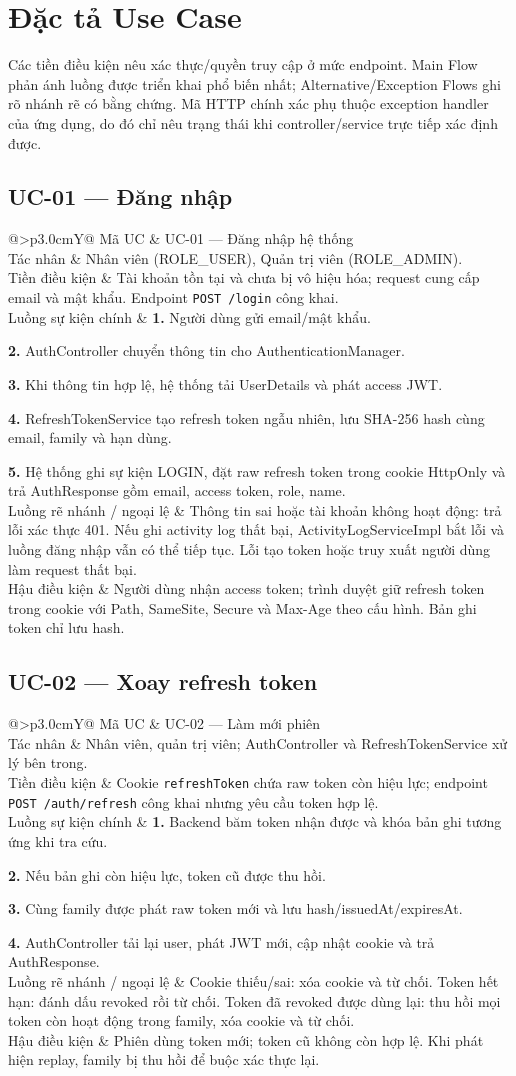 \documentclass[12pt,a4paper,oneside]{report}
\makeatletter
\newcommand{\UC}[6]{%
\par\medskip\noindent\begin{tabularx}{\textwidth}{@{}>{\bfseries\color{navy}}p{3.0cm}Y@{}}\toprule
Mã UC & #1\\
Tác nhân & #2\\
Tiền điều kiện & #3\\
Luồng sự kiện chính & #4\\
Luồng rẽ nhánh / ngoại lệ & #5\\
Hậu điều kiện & #6\\
\bottomrule\end{tabularx}\par\smallskip
}
\makeatother
\begin{document}
\section{Đặc tả Use Case}
Các tiền điều kiện nêu xác thực/quyền truy cập ở mức endpoint. Main Flow phản ánh luồng được triển khai phổ biến nhất; Alternative/Exception Flows ghi rõ nhánh rẽ có bằng chứng. Mã HTTP chính xác phụ thuộc exception handler của ứng dụng, do đó chỉ nêu trạng thái khi controller/service trực tiếp xác định được.

\subsection{UC-01 — Đăng nhập}
\UC{UC-01 — Đăng nhập hệ thống}{Nhân viên (ROLE\_USER), Quản trị viên (ROLE\_ADMIN).}{Tài khoản tồn tại và chưa bị vô hiệu hóa; request cung cấp email và mật khẩu. Endpoint \texttt{POST /login} công khai.}{\textbf{1.} Người dùng gửi email/mật khẩu.\par\textbf{2.} AuthController chuyển thông tin cho AuthenticationManager.\par\textbf{3.} Khi thông tin hợp lệ, hệ thống tải UserDetails và phát access JWT.\par\textbf{4.} RefreshTokenService tạo refresh token ngẫu nhiên, lưu SHA-256 hash cùng email, family và hạn dùng.\par\textbf{5.} Hệ thống ghi sự kiện LOGIN, đặt raw refresh token trong cookie HttpOnly và trả AuthResponse gồm email, access token, role, name.}{Thông tin sai hoặc tài khoản không hoạt động: trả lỗi xác thực 401. Nếu ghi activity log thất bại, ActivityLogServiceImpl bắt lỗi và luồng đăng nhập vẫn có thể tiếp tục. Lỗi tạo token hoặc truy xuất người dùng làm request thất bại.}{Người dùng nhận access token; trình duyệt giữ refresh token trong cookie với Path, SameSite, Secure và Max-Age theo cấu hình. Bản ghi token chỉ lưu hash.}

\subsection{UC-02 — Xoay refresh token}
\UC{UC-02 — Làm mới phiên}{Nhân viên, quản trị viên; AuthController và RefreshTokenService xử lý bên trong.}{Cookie \texttt{refreshToken} chứa raw token còn hiệu lực; endpoint \texttt{POST /auth/refresh} công khai nhưng yêu cầu token hợp lệ.}{\textbf{1.} Backend băm token nhận được và khóa bản ghi tương ứng khi tra cứu.\par\textbf{2.} Nếu bản ghi còn hiệu lực, token cũ được thu hồi.\par\textbf{3.} Cùng family được phát raw token mới và lưu hash/issuedAt/expiresAt.\par\textbf{4.} AuthController tải lại user, phát JWT mới, cập nhật cookie và trả AuthResponse.}{Cookie thiếu/sai: xóa cookie và từ chối. Token hết hạn: đánh dấu revoked rồi từ chối. Token đã revoked được dùng lại: thu hồi mọi token còn hoạt động trong family, xóa cookie và từ chối.}{Phiên dùng token mới; token cũ không còn hợp lệ. Khi phát hiện replay, family bị thu hồi để buộc xác thực lại.}
\end{document}
